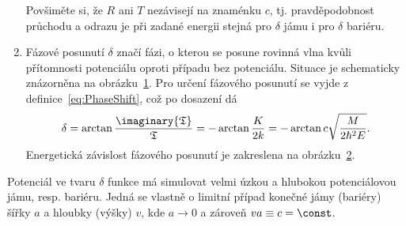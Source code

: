 \begin{solution}
\begin{enumerate}
        \begin{note}
            Povšiměte si, že $R$ ani $T$ nezávisejí na znaménku $c$, tj. pravděpodobnost průchodu a odrazu je při zadané energii stejná pro $\delta$ jámu i pro $\delta$ bariéru.
        \end{note}    
    					
	\item
		Fázové posunutí 
		$\delta$ značí fázi, o kterou se posune rovinná vlna kvůli přítomnosti potenciálu oproti případu bez potenciálu.
		Situace je schematicky znázorněna na obrázku~\ref{fig:DeltaWFPhaseShift}.
		Pro určení fázového posunutí se vyjde z definice~\eqref{eq:PhaseShift}, což po dosazení dá
		\begin{equation}
			\delta=\arctan{\frac{\imaginary{\mathfrak{T}}}{\real{\mathfrak{T}}}}
				=-\arctan{\frac{K}{2k}}
				=-\arctan{c\sqrt{\frac{M}{2\hbar^{2}E}}}.
			\label{eq:DeltaPhaseShift}
		\end{equation}
		Energetická závislost fázového posunutí je zakreslena na obrázku~\ref{fig:DeltaPhaseShift}.

		\begin{figure}[!htbp]
			\centering
			\label{fig:DeltaWFPhaseShift}
		\end{figure}
		
		\begin{figure}[!htbp]
			\centering
			\label{fig:DeltaPhaseShift}
		\end{figure}			
	\end{enumerate}	
\end{solution}

\begin{note}
    Potenciál ve tvaru $\delta$ funkce má simulovat velmi úzkou a hlubokou potenciálovou jámu, resp. bariéru.
    Jedná se vlastně o limitní případ konečné jámy (bariéry) šířky $a$ a hloubky (výšky) $v$, kde $a\rightarrow0$ a zároveň $va\equiv c=\const$.
\end{note}
